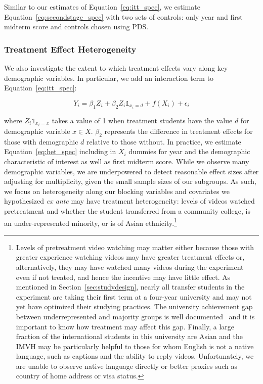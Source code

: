 \documentclass[12pt]{article}
\begin{document}
Similar to our estimates of Equation~\ref{eq:itt_spec}, we estimate Equation~\ref{eq:secondstage_spec} with two sets of controls: only year and first midterm score and controls chosen using PDS\@.

\subsubsection{Treatment Effect Heterogeneity}

We also investigate the extent to which treatment effects vary along key demographic variables.
In particular, we add an interaction term to Equation~\ref{eq:itt_spec}:

\begin{equation} \label{eq:het_spec}
	Y_i = \beta_1 Z_i + \beta_2 Z_i \mathds{1}_{x_i=d} + f(X_i) + \epsilon_i
\end{equation}

where $Z_i \mathds{1}_{x_i=x}$ takes a value of 1 when treatment students have the value $d$ for demographic variable $x \in X$. $\beta_2$ represents the difference in treatment effects for those with demographic $d$ relative to those without.
In practice, we estimate Equation~\ref{eq:het_spec} including in $X_i$ dummies for year and the demographic characteristic of interest as well as first midterm score.
While we observe many demographic variables, we are underpowered to detect reasonable effect sizes after adjusting for multiplicity, given the small sample sizes of our subgroups.
As such, we focus on heterogeneity along our blocking variables and covariates we hypothesized \textit{ex ante} may have treatment heterogeneity:  levels of videos watched pretreatment and whether the student transferred from a community college, is an under-represented minority, or is of Asian ethnicity.\footnote{Levels of pretreatment video watching may matter either because those with greater experience watching videos may have greater treatment effects or, alternatively, they may have watched many videos during the experiment even if not treated, and hence the incentive may have little effect. As mentioned in Section~\ref{sec:studydesign}, nearly all transfer students in the experiment are taking their first term at a four-year university and may not yet have optimized their studying practices. The university achievement gap between underrepresented and majority groups is well documented~\parencite{bcm2009} and it is important to know how treatment may affect this gap.  Finally, a large fraction of the international students in this university are Asian and the IMVH may be particularly helpful to those for whom English is not a native language, such as captions and the ability to reply videos.  Unfortunately, we are unable to observe native language directly or better proxies such as country of home address or visa status.}
\end{document}
